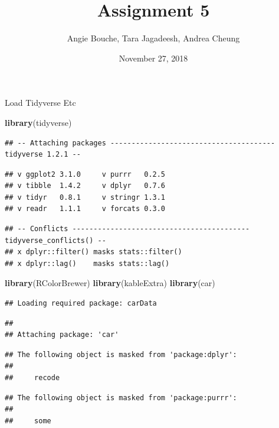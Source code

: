 \documentclass[]{article}
\title{Assignment 5}
\author{Angie Bouche, Tara Jagadeesh, Andrea Cheung}
\date{November 27, 2018}
\newenvironment{Shaded}{\begin{snugshade}}{\end{snugshade}}
\newcommand{\KeywordTok}[1]{\textcolor[rgb]{0.13,0.29,0.53}{\textbf{#1}}}
\newcommand{\NormalTok}[1]{#1}
\begin{document}
\maketitle

Load Tidyverse Etc

\begin{Shaded}
\begin{Highlighting}[]
\KeywordTok{library}\NormalTok{(tidyverse)}
\end{Highlighting}
\end{Shaded}

\begin{verbatim}
## -- Attaching packages --------------------------------------- tidyverse 1.2.1 --
\end{verbatim}

\begin{verbatim}
## v ggplot2 3.1.0     v purrr   0.2.5
## v tibble  1.4.2     v dplyr   0.7.6
## v tidyr   0.8.1     v stringr 1.3.1
## v readr   1.1.1     v forcats 0.3.0
\end{verbatim}

\begin{verbatim}
## -- Conflicts ------------------------------------------ tidyverse_conflicts() --
## x dplyr::filter() masks stats::filter()
## x dplyr::lag()    masks stats::lag()
\end{verbatim}

\begin{Shaded}
\begin{Highlighting}[]
\KeywordTok{library}\NormalTok{(RColorBrewer)}
\KeywordTok{library}\NormalTok{(kableExtra)}
\KeywordTok{library}\NormalTok{(car)}
\end{Highlighting}
\end{Shaded}

\begin{verbatim}
## Loading required package: carData
\end{verbatim}

\begin{verbatim}
## 
## Attaching package: 'car'
\end{verbatim}

\begin{verbatim}
## The following object is masked from 'package:dplyr':
## 
##     recode
\end{verbatim}

\begin{verbatim}
## The following object is masked from 'package:purrr':
## 
##     some
\end{verbatim}
\end{document}
